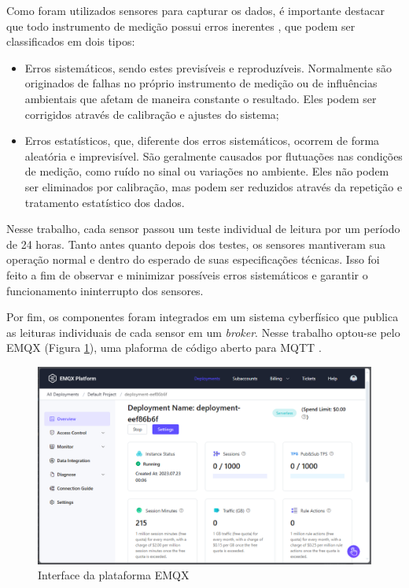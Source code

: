 Como foram utilizados sensores para capturar os dados, é importante destacar que todo instrumento de medição possui erros inerentes \parencite{Vuolo_erro1996}, que podem ser classificados em dois tipos:

\begin{itemize} 
    \item Erros sistemáticos, sendo estes previsíveis e reproduzíveis. Normalmente são originados de falhas no próprio instrumento de medição ou de influências ambientais que afetam de maneira constante o resultado. Eles podem ser corrigidos através de calibração e ajustes do sistema;
    \item Erros estatísticos, que, diferente dos erros sistemáticos, ocorrem de forma aleatória e imprevisível. São geralmente causados por flutuações nas condições de medição, como ruído no sinal ou variações no ambiente. Eles não podem ser eliminados por calibração, mas podem ser reduzidos através da repetição e tratamento estatístico dos dados. 
\end{itemize}

Nesse trabalho, cada sensor passou um teste individual de leitura por um período de 24 horas. Tanto antes quanto depois dos testes, os sensores mantiveram sua operação normal e dentro do esperado de suas especificações técnicas. Isso foi feito a fim de observar e minimizar possíveis erros sistemáticos e garantir o funcionamento ininterrupto dos sensores.

Por fim, os componentes foram integrados em um sistema cyberfísico que publica as leituras individuais de cada sensor em um \textit{broker}. Nesse trabalho optou-se pelo EMQX (Figura \ref{figura:emqx}), uma plaforma de código aberto para MQTT \parencite{EMQX}.

\begin{figure}[!htb] \centering
  \caption{Interface da plataforma EMQX} \label{figura:emqx}
  \begin{varwidth}{\linewidth}
    \includegraphics[width=16cm]{figuras/emqx.png}
  \end{varwidth}
\end{figure}

